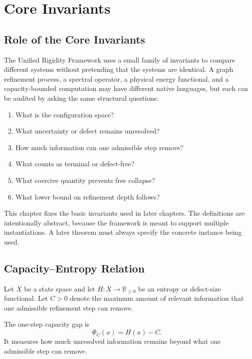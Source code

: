 \chapter{Core Invariants}

\section{Role of the Core Invariants}

The Unified Rigidity Framework uses a small family of invariants to compare
different systems without pretending that the systems are identical. A graph
refinement process, a spectral operator, a physical energy functional, and a
capacity-bounded computation may have different native languages, but each can
be audited by asking the same structural questions:

\begin{enumerate}
\item What is the configuration space?
\item What uncertainty or defect remains unresolved?
\item How much information can one admissible step remove?
\item What counts as terminal or defect-free?
\item What coercive quantity prevents free collapse?
\item What lower bound on refinement depth follows?
\end{enumerate}

This chapter fixes the basic invariants used in later chapters. The definitions
are intentionally abstract, because the framework is meant to support multiple
instantiations. A later theorem must always specify the concrete instance being
used.

\section{Capacity--Entropy Relation}

Let \(X\) be a state space and let \(H:X\to\mathbb R_{\ge 0}\) be an entropy or
defect-size functional. Let \(C>0\) denote the maximum amount of relevant
information that one admissible refinement step can remove.

\begin{definition}
The one-step capacity gap is
\[
\Phi_C(x)=H(x)-C.
\]
It measures how much unresolved information remains beyond what one admissible
step can remove.
\end{definition}

